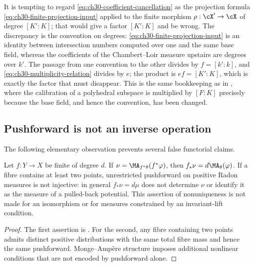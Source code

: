\begin{remark}
\label{rem:ch30-two-inputs}
It is tempting to regard \eqref{eq:ch30-coefficient-cancellation} as the
projection formula \eqref{eq:ch30-finite-projection-input} applied to the
finite morphism $\rho:\cX'\to\cX$ of degree $[K':K]$; that would give a
factor $[K':K]$ and be wrong.  The discrepancy is the convention on
degrees: \eqref{eq:ch30-finite-projection-input} is an identity between
intersection numbers computed over one and the same base field, whereas the
coefficients of the Chambert--Loir measure upstairs are degrees over
$k'$.  The passage from one convention to the other divides by
$f=[k':k]$, and \eqref{eq:ch30-multiplicity-relation} divides by
$e$; the product is $ef=[K':K]$, which is exactly the factor that must
disappear.  This is the same bookkeeping as in
, where the calibration of a
polyhedral subspace is multiplied by $[F:K]$ precisely because the base
field, and hence the convention, has been changed.
\end{remark}

\subsection{Pushforward is not an inverse operation}
\label{sec:ch30-not-inverse}

The following elementary observation prevents several false functorial
claims.

\begin{proposition}
\label{prop:ch30-pushforward-not-inverse}
Let $f:Y\to X$ be finite of degree $d$.  If
$\nu=\MA_{f^*\theta}(f^*\varphi)$, then
$f_*\nu=d\MA_\theta(\varphi)$.  If a fibre contains at least two points, unrestricted pushforward on
positive Radon measures is not injective: in general
$f_*\nu=d\mu$ does not determine $\nu$ or identify it as the measure
of a pulled-back potential.  This assertion of nonuniqueness is not made
for an isomorphism or for measures constrained by an invariant-lift
condition.
\end{proposition}

\begin{proof}
The first assertion is .  For the
second, any fibre containing two points admits distinct positive
distributions with the same total fibre mass and hence the same pushforward.
Monge--Amp\`ere structure imposes additional nonlinear conditions that are
not encoded by pushforward alone.
\end{proof}

